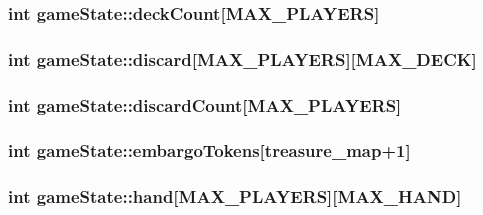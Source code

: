 \subsubsection[{\texorpdfstring{deck\+Count}{deckCount}}]{\setlength{\rightskip}{0pt plus 5cm}int game\+State\+::deck\+Count\mbox{[}{\bf M\+A\+X\+\_\+\+P\+L\+A\+Y\+E\+RS}\mbox{]}}\hypertarget{structgameState_a43504879689095a8e4c6d8ae00d20d6d}{}\label{structgameState_a43504879689095a8e4c6d8ae00d20d6d}
\subsubsection[{\texorpdfstring{discard}{discard}}]{\setlength{\rightskip}{0pt plus 5cm}int game\+State\+::discard\mbox{[}{\bf M\+A\+X\+\_\+\+P\+L\+A\+Y\+E\+RS}\mbox{]}\mbox{[}{\bf M\+A\+X\+\_\+\+D\+E\+CK}\mbox{]}}\hypertarget{structgameState_acf66c1bd51ef3e11bbe7f6f4a828d123}{}\label{structgameState_acf66c1bd51ef3e11bbe7f6f4a828d123}
\subsubsection[{\texorpdfstring{discard\+Count}{discardCount}}]{\setlength{\rightskip}{0pt plus 5cm}int game\+State\+::discard\+Count\mbox{[}{\bf M\+A\+X\+\_\+\+P\+L\+A\+Y\+E\+RS}\mbox{]}}\hypertarget{structgameState_abfab9c8927a85b14ffdb70b742fb7583}{}\label{structgameState_abfab9c8927a85b14ffdb70b742fb7583}
\subsubsection[{\texorpdfstring{embargo\+Tokens}{embargoTokens}}]{\setlength{\rightskip}{0pt plus 5cm}int game\+State\+::embargo\+Tokens\mbox{[}{\bf treasure\+\_\+map}+1\mbox{]}}\hypertarget{structgameState_ad5d3a35640d9d9d585a9703346366987}{}\label{structgameState_ad5d3a35640d9d9d585a9703346366987}
\subsubsection[{\texorpdfstring{hand}{hand}}]{\setlength{\rightskip}{0pt plus 5cm}int game\+State\+::hand\mbox{[}{\bf M\+A\+X\+\_\+\+P\+L\+A\+Y\+E\+RS}\mbox{]}\mbox{[}{\bf M\+A\+X\+\_\+\+H\+A\+ND}\mbox{]}}\hypertarget{structgameState_a8f91bb7a0f3cf01dc5df1472efdbb287}{}\label{structgameState_a8f91bb7a0f3cf01dc5df1472efdbb287}
